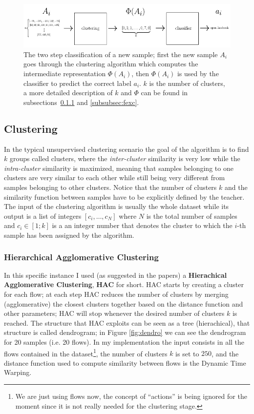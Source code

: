 \begin{figure}[h]
 \centering
 \includegraphics{images/actual}
 \caption{\small{The two step classification of a new sample; first the new sample $A_i$ goes through the clustering algorithm which computes the intermediate representation $\Phi(A_i)$, then $\Phi(A_i)$ is used by the classifier to predict the correct label $a_i$. $k$ is the number of clusters, a more detailed description of $k$ and $\Phi$ can be found in subsections~\ref{subsubsec:hac} and \ref{subsubsec:fexc}.}}
 \label{fig:actual}
\end{figure}

\subsection{Clustering}
In the typical unsupervised clustering scenario the goal of the algorithm is to find $k$ groups called clusters, where the \textit{inter-cluster} similarity is very low while the \textit{intra-cluster} similarity is maximized, meaning that samples belonging to one clusters are very similar to each other while still being very different from samples belonging to other clusters. Notice that the number of clusters $k$ and the similarity function between samples have to be explicitly defined by the teacher. The input of the clustering algorithm is usually the whole dataset while its output is a list of integers $[c_i,\dots, c_N]$ where $N$ is the total number of samples and $c_i \in [1;k]$ is a an integer number that denotes the cluster to which the $i$-th sample has been assigned by the algorithm.

\subsubsection{Hierarchical Agglomerative Clustering}
\label{subsubsec:hac}
In this specific instance I used (as suggested in the papers) a \textbf{Hierachical Agglomerative Clustering}, \textbf{HAC} for short. HAC starts by creating a cluster for each flow; at each step HAC reduces the number of clusters by merging (agglomerative) the closest clusters together based on the distance function and other parameters; HAC will stop whenever the desired number of clusters $k$ is reached. The structure that HAC exploits can be seen as a tree (hierachical), that structure is called dendrogram; in Figure \ref{fig:dendro} we can see the dendrogram for 20 samples (i.e. 20 flows). In my implementation the input consists in all the flows contained in the dataset\footnote{We are just using flows now, the concept of ``actions'' is being ignored for the moment since it is not really needed for the clustering stage.}, the number of clusters $k$ is set to $250$, and the distance function used to compute similarity between flows is the Dynamic Time Warping.

